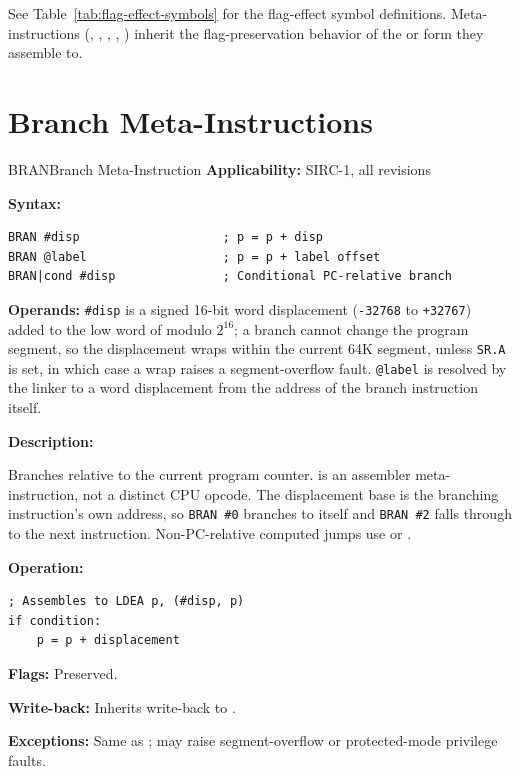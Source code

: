 See Table~\ref{tab:flag-effect-symbols} for the flag-effect symbol definitions. Meta-instructions (,
, , , ) inherit the flag-preservation behavior of the
 or  form they assemble to.

\section{Branch Meta-Instructions}

\begin{instructionbox}{BRAN}{Branch Meta-Instruction}
	\textbf{Applicability:} SIRC-1, all revisions

	\textbf{Syntax:}
	\begin{lstlisting}
BRAN #disp                    ; p = p + disp
BRAN @label                   ; p = p + label offset
BRAN|cond #disp               ; Conditional PC-relative branch
\end{lstlisting}

	\textbf{Operands:} \texttt{\#disp} is a signed 16-bit word displacement (\texttt{-32768} to \texttt{+32767}) added to
	the low word of  modulo $2^{16}$; a branch cannot change the program segment, so the displacement wraps within
	the current 64K segment, unless \texttt{SR.A} is set, in which case a wrap raises a segment-overflow fault.
	\texttt{@label} is resolved by the linker to a word displacement from the address of the branch instruction itself.

	\textbf{Description:}

	Branches relative to the current program counter.  is an assembler meta-instruction, not a distinct CPU
	opcode. The displacement base is the branching instruction's own address, so \texttt{BRAN \#0} branches to itself and
	\texttt{BRAN \#2} falls through to the next instruction. Non-PC-relative computed jumps use  or .

	\textbf{Operation:}
	\begin{verbatim}
; Assembles to LDEA p, (#disp, p)
if condition:
    p = p + displacement
\end{verbatim}

	\textbf{Flags:} Preserved.

	\textbf{Write-back:} Inherits  write-back to .

	\textbf{Exceptions:} Same as ; may raise segment-overflow or protected-mode privilege faults.


\end{instructionbox}
